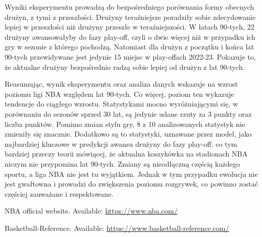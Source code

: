 \documentclass{article}
\begin{document}
Wyniki eksperymentu prowadzą do bezpośredniego porównania formy obecnych drużyn, z tymi z przeszłości. Drużyny teraźniejsze poradziły sobie zdecydowanie lepiej w przeszłości niż drużyny przeszłe w teraźniejszości. W latach 90-tych, 22 drużyny awansowałyby do fazy play-off, czyli o dwie więcej niż w przypadku ich gry w sezonie z którego pochodzą. Natomiast dla drużyn z początku i końca lat 90-tych przewidywane jest jedynie 15 miejsc w play-offach 2022-23. Pokazuje to, że aktualne drużyny bezpośrednio radzą sobie lepiej od drużyn z lat 90-tych.

Reasumując, wynik eksperymentu oraz analiza danych wskazuje na wzrost poziomu ligi NBA względem lat 90-tych. Co więcej, poziom ten wykazuje tendencje do ciągłego wzrostu. Statystykami mocno wyróżniającymi się, w porównaniu do sezonów sprzed 30 lat, są jedynie udane rzuty za 3 punkty oraz liczba punktów. Pomimo zmian stylu gry, 8 z 10 analizowanych statystyk nie zmieniły się znacznie. Dodatkowo są to statystyki, uznawane przez model, jako najbardziej kluczowe w predykcji awansu drużyny do fazy play-off, co tym bardziej przeczy teorii mówiącej, że aktualna koszykówka na stadionach NBA niczym nie przypomina lat 90-tych. Zmiany są nieodłączną częścią każdego sportu, a liga NBA nie jest tu wyjątkiem. Jednak w tym przypadku ewolucja nie jest gwałtowna i prowadzi do zwiększenia poziomu rozgrywek, co powinno zostać częściej zauważane i respektowane.







\begin{thebibliography}{9}
NBA official website. Available: \url{https://www.nba.com/}

Basketball-Reference. Available: \url{https://www.basketball-reference.com/}

\end{thebibliography}
\end{document}
